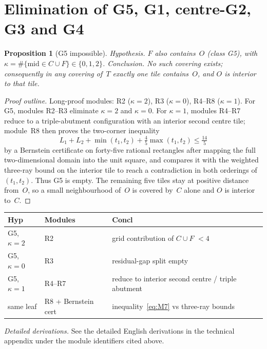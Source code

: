 \documentclass[11pt,reqno]{amsart}
\newtheorem{proposition}[theorem]{Proposition}
\theoremstyle{definition}
\begin{document}
\section{Elimination of G5, G1, centre-G2, G3 and G4}\label{sec:early}

\begin{proposition}[G5 impossible]\label{prop:M41}
\emph{Hypothesis.} $F$ also contains~$O$ (class G5), with
$\kappa=\#\{\mathrm{mid}\in C\cup F\}\in\{0,1,2\}$.
\emph{Conclusion.} No such covering exists; consequently in any covering of~$T$
exactly one tile contains~$O$, and $O$ is interior to that tile.
\end{proposition}

\begin{proof}[Proof outline]
Long-proof modules: R2 ($\kappa=2$), R3 ($\kappa=0$), R4--R8 ($\kappa=1$).
For G5, modules R2--R3 eliminate $\kappa=2$ and $\kappa=0$.  For $\kappa=1$, modules
R4--R7 reduce to a triple-abutment configuration with an interior second
centre tile; module~R8 then proves the two-corner inequality
\begin{equation}\label{eq:M7}
L_1+L_2+\min(t_1,t_2)+\tfrac45\max(t_1,t_2)\le\tfrac{14}{5}
\end{equation}
by a Bernstein certificate on forty-five rational rectangles after mapping the
full two-dimensional domain into the unit square, and compares it with the
weighted three-ray bound on the interior tile to reach a contradiction in both
orderings of $(t_1,t_2)$.  Thus G5 is empty.  The remaining five tiles stay at
positive distance from~$O$, so a small neighbourhood of~$O$ is covered by~$C$
alone and $O$ is interior to~$C$.
\end{proof}

\begin{center}
\small
\begin{tabular}{@{}llp{}@{}}
\toprule
Hyp & Modules & Concl \\
\midrule
G5, $\kappa=2$ & R2 & grid contribution of $C\cup F$ $<4$ \\
G5, $\kappa=0$ & R3 & residual-gap split empty \\
G5, $\kappa=1$ & R4--R7 & reduce to interior second centre / triple abutment \\
same leaf & R8 + Bernstein cert & inequality~\eqref{eq:M7} vs three-ray bounds \\
\bottomrule
\end{tabular}
\end{center}
\smallskip
\noindent\emph{Detailed derivations.} See the detailed English derivations in the technical appendix under the module identifiers cited above.
\end{document}
